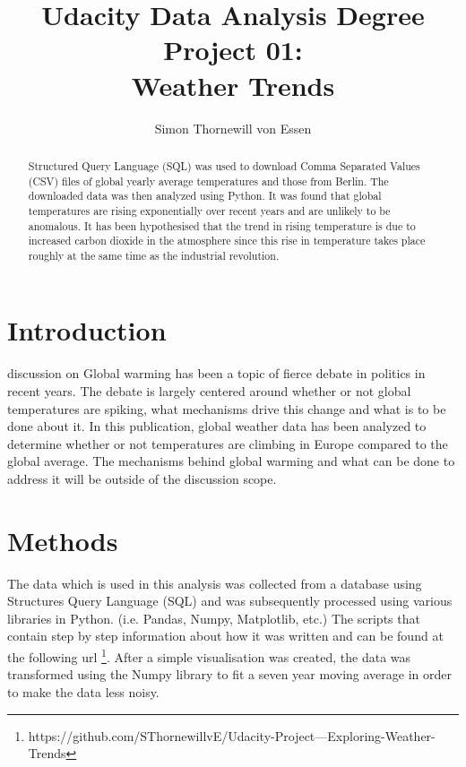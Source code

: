 \documentclass[journal, a4paper]{IEEEtran}
\begin{document}
	\title{Udacity Data Analysis Degree Project 01: \\ Weather Trends}
	\author{Simon Thornewill von Essen}
	\maketitle

\begin{abstract}
	Structured Query Language (SQL)  was used to download Comma Separated Values (CSV) files of global yearly average temperatures and those from Berlin. The downloaded data was then analyzed using Python. It was found that global temperatures are rising exponentially over recent years and are unlikely to be anomalous. It has been hypothesised that the trend in rising temperature is due to increased carbon dioxide in the atmosphere since this rise in temperature takes place roughly at the same time as the industrial revolution.
\end{abstract}

\section{Introduction}
	 discussion on Global warming has been a topic of fierce debate in politics in recent years. The debate is largely centered around whether or not global temperatures are spiking, what mechanisms drive this change and what is to be done about it. In this publication, global weather data has been analyzed to determine whether or not temperatures are climbing in Europe compared to the global average. The mechanisms behind global warming and what can be done to address it will be outside of the discussion scope.
    
	\section{Methods}    
    
    The data which is used in this analysis was collected from a database using Structures Query Language (SQL) and was subsequently processed using various libraries in Python. (i.e. Pandas, Numpy, Matplotlib, etc.) The scripts that contain step by step information about how it was written and can be found at the following url \footnote{https://github.com/SThornewillvE/Udacity-Project---Exploring-Weather-Trends}. After a simple visualisation was created, the data was transformed using the Numpy library to fit a seven year moving average in order to make the data less noisy.
    
\end{document}
